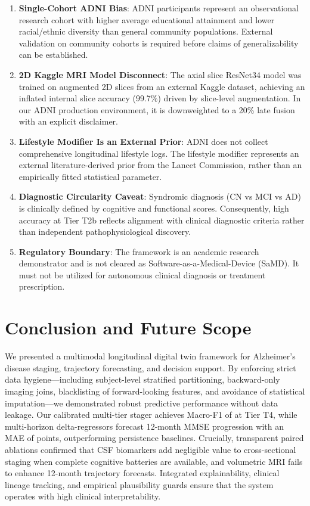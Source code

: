 \documentclass[11pt,a4paper]{article}
\begin{document}
\begin{enumerate}
    \item \textbf{Single-Cohort ADNI Bias}: ADNI participants represent an observational research cohort with higher average educational attainment and lower racial/ethnic diversity than general community populations. External validation on community cohorts is required before claims of generalizability can be established.
    \item \textbf{2D Kaggle MRI Model Disconnect}: The axial slice ResNet34 model was trained on augmented 2D slices from an external Kaggle dataset, achieving an inflated internal slice accuracy (99.7\%) driven by slice-level augmentation. In our ADNI production environment, it is downweighted to a 20\% late fusion with an explicit disclaimer.
    \item \textbf{Lifestyle Modifier Is an External Prior}: ADNI does not collect comprehensive longitudinal lifestyle logs. The lifestyle modifier represents an external literature-derived prior from the Lancet Commission, rather than an empirically fitted statistical parameter.
    \item \textbf{Diagnostic Circularity Caveat}: Syndromic diagnosis (CN vs MCI vs AD) is clinically defined by cognitive and functional scores. Consequently, high accuracy at Tier T2b reflects alignment with clinical diagnostic criteria rather than independent pathophysiological discovery.
    \item \textbf{Regulatory Boundary}: The framework is an academic research demonstrator and is not cleared as Software-as-a-Medical-Device (SaMD). It must not be utilized for autonomous clinical diagnosis or treatment prescription.
\end{enumerate}


\section{Conclusion and Future Scope}
\label{sec:conclusion}
We presented a multimodal longitudinal digital twin framework for Alzheimer's disease staging, trajectory forecasting, and decision support. By enforcing strict data hygiene—including subject-level stratified partitioning, backward-only imaging joins, blacklisting of forward-looking features, and avoidance of statistical imputation—we demonstrated robust predictive performance without data leakage. Our calibrated multi-tier stager achieves Macro-F1 of \StagerTFourFOne{} at Tier T4, while multi-horizon delta-regressors forecast 12-month MMSE progression with an MAE of \MMSEMAEXII{} points, outperforming persistence baselines. Crucially, transparent paired ablations confirmed that CSF biomarkers add negligible value to cross-sectional staging when complete cognitive batteries are available, and volumetric MRI fails to enhance 12-month trajectory forecasts. Integrated explainability, clinical lineage tracking, and empirical plausibility guards ensure that the system operates with high clinical interpretability.
\end{document}
